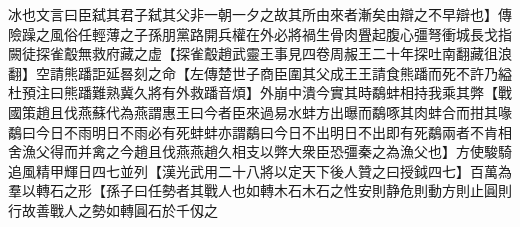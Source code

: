 冰也文言曰臣弑其君子弑其父非一朝一夕之故其所由來者漸矣由辯之不早辯也】傳險躁之風俗任輕薄之子孫朋黨路開兵權在外必將禍生骨肉舋起腹心彊弩衝城長戈指闕徒探雀鷇無救府藏之虚【探雀鷇趙武靈王事見四卷周赧王二十年探吐南翻藏徂浪翻】空請熊蹯詎延晷刻之命【左傳楚世子商臣圍其父成王王請食熊蹯而死不許乃縊杜預注曰熊蹯難熟冀久將有外救蹯音煩】外崩中潰今實其時鷸蚌相持我乘其弊【戰國策趙且伐燕蘇代為燕謂惠王曰今者臣來過易水蚌方出曝而鷸啄其肉蚌合而拑其喙鷸曰今日不雨明日不雨必有死蚌蚌亦謂鷸曰今日不出明日不出即有死鷸兩者不肯相舍漁父得而并禽之今趙且伐燕燕趙久相支以弊大衆臣恐彊秦之為漁父也】方使駿騎追風精甲輝日四七並列【漢光武用二十八將以定天下後人贊之曰授鉞四七】百萬為羣以轉石之形【孫子曰任勢者其戰人也如轉木石木石之性安則静危則動方則止圓則行故善戰人之勢如轉圓石於千仭之